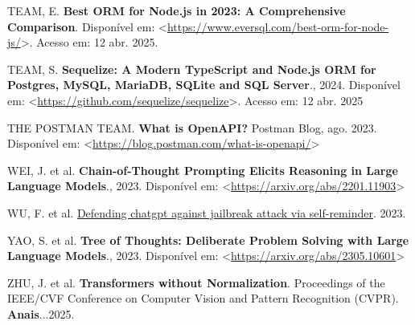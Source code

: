 \documentclass[
]{article}
\newlength{\cslhangindent}
\newenvironment{CSLReferences}[2] %
 {\begin{list}{}{%
  \setlength{\itemindent}{0pt}
  \setlength{\leftmargin}{0pt}
  \setlength{\parsep}{0pt}
  \ifodd #1
   \setlength{\leftmargin}{\cslhangindent}
   \setlength{\itemindent}{-1\cslhangindent}
  \fi
  \setlength{\itemsep}{#2\baselineskip}}}
 {\end{list}}
\begin{document}
\begin{CSLReferences}{0}{1}
TEAM, E. \textbf{Best ORM for Node.js in 2023: A Comprehensive
Comparison}. Disponível em:
\textless{}\url{https://www.eversql.com/best-orm-for-node-js/}\textgreater.
Acesso em: 12 abr. 2025.

TEAM, S. \textbf{Sequelize: A Modern TypeScript and Node.js ORM for
Postgres, MySQL, MariaDB, SQLite and SQL Server}., 2024. Disponível em:
\textless{}\url{https://github.com/sequelize/sequelize}\textgreater.
Acesso em: 12 abr. 2025

THE POSTMAN TEAM. \textbf{{What is OpenAPI?}} Postman Blog, ago. 2023.
Disponível em:
\textless{}\url{https://blog.postman.com/what-is-openapi/}\textgreater{}

WEI, J. et al. \textbf{Chain-of-Thought Prompting Elicits Reasoning in
Large Language Models}., 2023. Disponível em:
\textless{}\url{https://arxiv.org/abs/2201.11903}\textgreater{}

WU, F. et al.
\href{https://www.researchsquare.com/article/rs-2873090/v1}{Defending
chatgpt against jailbreak attack via self-reminder}. 2023.

YAO, S. et al. \textbf{Tree of Thoughts: Deliberate Problem Solving with
Large Language Models}., 2023. Disponível em:
\textless{}\url{https://arxiv.org/abs/2305.10601}\textgreater{}

ZHU, J. et al. \textbf{Transformers without Normalization}. Proceedings
of the IEEE/CVF Conference on Computer Vision and Pattern Recognition
(CVPR). \textbf{Anais}...2025.

\end{CSLReferences}
\end{document}
